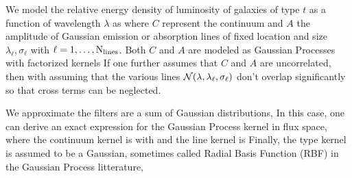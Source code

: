 \documentclass[aps,prd,showpacs,superscriptaddress,groupedaddress]{revtex4}  %
\begin{document}
We model the relative energy density of luminosity of galaxies of type $t$ as a function of wavelength $\lambda$ as
where $C$ represent the continuum and $A$ the amplitude of Gaussian emission or absorption lines of fixed location and size $ \lambda_\ell, \sigma_\ell$ with $\ell = 1, \ldots, {\rm N}_{\rm lines}$. Both $C$ and $A$ are modeled as Gaussian Processes with factorized kernels
If one further assumes that $C$ and $A$ are uncorrelated, then 
with 
assuming that the various lines $\mathcal{N}(\lambda, \lambda_\ell, \sigma_\ell)$ don't overlap significantly so that cross terms can be neglected.

We approximate the filters are a sum of Gaussian distributions,
In this case, one can derive an exact expression for the Gaussian Process kernel in flux space,
where the continuum kernel is
with
and the line kernel is
Finally, the type kernel is assumed to be a Gaussian, sometimes called Radial Basis Function (RBF) in the Gaussian Process litterature,
\end{document}
